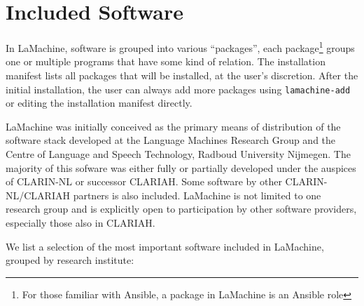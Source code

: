 \documentclass[a4paper,11pt]{article}
\begin{document}
\section{Included Software}

In LaMachine, software is grouped into various ``packages'', each package\footnote{For those familiar with
Ansible, a package in LaMachine is an Ansible role} groups one or multiple programs that have some kind of relation. The
installation manifest lists all packages that will be installed, at the user's discretion. After the initial
installation, the user can always add more packages using \texttt{lamachine-add} or editing the installation manifest directly.

LaMachine was initially conceived as the primary means of distribution of the software stack developed at the Language
Machines Research Group and the Centre of
Language and Speech Technology, Radboud University Nijmegen. The majority of this sofware was either fully or partially developed under the auspices of CLARIN-NL or successor
CLARIAH. Some software by other CLARIN-NL/CLARIAH partners is also included. LaMachine is not limited to one research
group and is explicitly open to participation by other software providers, especially those
also in CLARIAH.

We list a selection of the most important software included in LaMachine, grouped by research institute:
\end{document}
